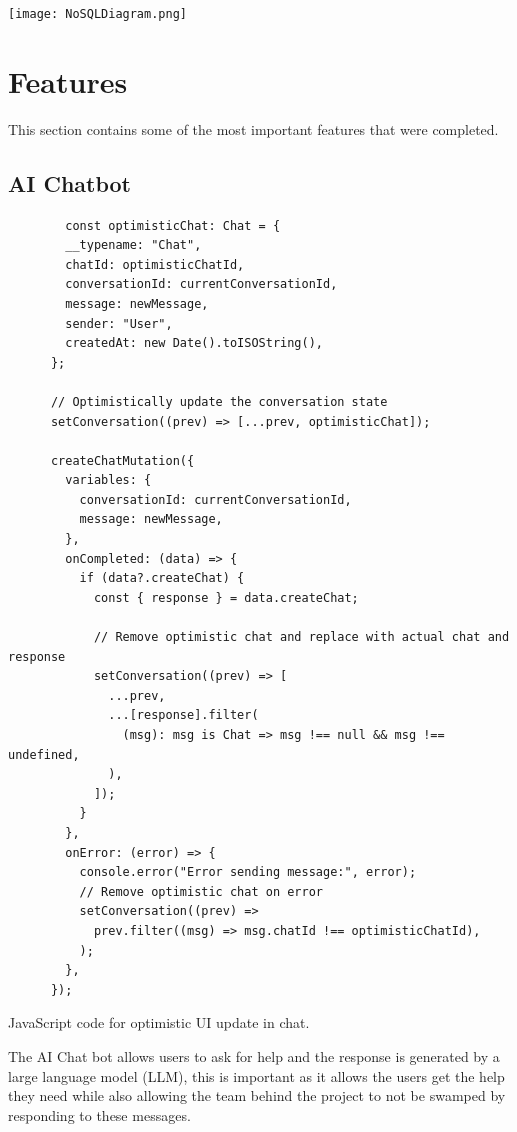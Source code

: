 \documentclass[]{project_report}
\begin{document}
\texttt{[image: NoSQLDiagram.png]}

\section{Features}

This section contains some of the most important features that were completed.

\subsection{AI Chatbot}

\begin{codeblock}[H]
    \begin{verbatim}
        const optimisticChat: Chat = {
        __typename: "Chat",
        chatId: optimisticChatId,
        conversationId: currentConversationId,
        message: newMessage,
        sender: "User",
        createdAt: new Date().toISOString(),
      };

      // Optimistically update the conversation state
      setConversation((prev) => [...prev, optimisticChat]);

      createChatMutation({
        variables: {
          conversationId: currentConversationId,
          message: newMessage,
        },
        onCompleted: (data) => {
          if (data?.createChat) {
            const { response } = data.createChat;

            // Remove optimistic chat and replace with actual chat and response
            setConversation((prev) => [
              ...prev,
              ...[response].filter(
                (msg): msg is Chat => msg !== null && msg !== undefined,
              ),
            ]);
          }
        },
        onError: (error) => {
          console.error("Error sending message:", error);
          // Remove optimistic chat on error
          setConversation((prev) =>
            prev.filter((msg) => msg.chatId !== optimisticChatId),
          );
        },
      });
\end{verbatim}
    \caption{JavaScript code for optimistic UI update in chat.}
    \label{code:optimistic-chat}
\end{codeblock}

The AI Chat bot allows users to ask for help and the response is generated by a large language model (LLM), this is important as it allows the users get the help they need while also allowing the team behind the project to not be swamped by responding to these messages. 
\end{document}
